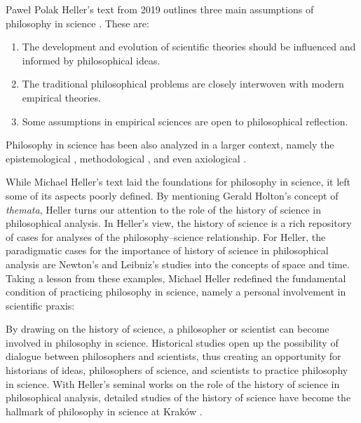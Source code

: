 \begin{artengenv}{Paweł Polak}
Heller’s text from 2019 outlines three main assumptions of philosophy in science
\parencite[p.\pageref{heller-three-points}]{pol_heller_how_2019}.
These are:

\begin{enumerate}[label=(\alph*)]
\item The development and evolution of scientific theories should be influenced and informed by philosophical ideas.
\item The traditional philosophical problems are closely interwoven with modern empirical theories.
\item Some assumptions in empirical sciences are open to philosophical reflection.
\end{enumerate}

Philosophy in science has been also analyzed in a larger context, namely the epistemological
\parencite{pol_heller_epistemologiczne_1987},
methodological
\parencite{pol_zycinski_structure_1988},
and even axiological
\parencites{pol_mcmullin_values_1982}[see also][]{pol_rodzen_w_1999}.

While Michael Heller’s text laid the foundations for philosophy in science, it left some of its aspects poorly defined.
By mentioning Gerald Holton’s concept of \textit{themata}, Heller turns our attention to the role of the history of
science in philosophical analysis. In Heller’s view, the history of science is a rich repository of cases for analyses
of the philosophy–science relationship. For Heller, the paradigmatic cases for the importance of history of science in
philosophical analysis are Newton’s and Leibniz’s studies into the concepts of space and time. Taking a lesson from
these examples, Michael Heller redefined the fundamental condition of practicing philosophy in science, namely a
personal involvement in scientific praxis:


By drawing on the history of science, a philosopher or scientist can become involved in philosophy in science.
Historical studies open up the possibility of dialogue between philosophers and scientists, thus creating an
opportunity for historians of ideas, philosophers of science, and scientists to practice philosophy in science. With
Heller’s seminal works on the role of the history of science in philosophical analysis, detailed studies of the history
of science have become the hallmark of philosophy in science at Kraków
\parencite{pol_polak_tradycja_2018}.


\end{artengenv}
